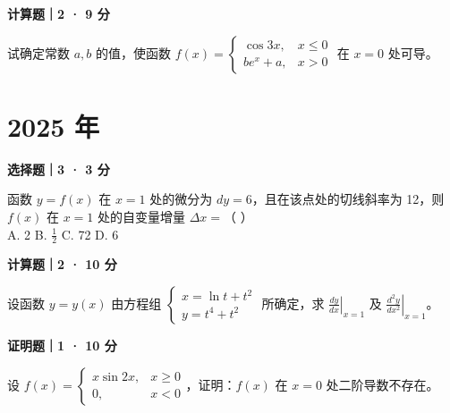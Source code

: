 \textbf{计算题｜2 · 9 分}

试确定常数 $a, b$ 的值，使函数 $f(x) = \begin{cases} \cos 3x, & x \le 0 \\ be^x+a, & x > 0 \end{cases}$ 在 $x = 0$ 处可导。


\section*{2025 年}


\textbf{选择题｜3 · 3 分}

函数 $y = f(x)$ 在 $x = 1$ 处的微分为 $dy = 6$，且在该点处的切线斜率为 12，则 $f(x)$ 在 $x = 1$ 处的自变量增量 $\Delta x =$（ \quad ）\\
A. 2 \quad B. $\frac{1}{2}$ \quad C. 72 \quad D. 6


\textbf{计算题｜2 · 10 分}

设函数 $y = y(x)$ 由方程组 $\begin{cases} x = \ln t + t^2 \\ y = t^4 + t^2 \end{cases}$ 所确定，求 $\left. \frac{dy}{dx} \right|_{x=1}$ 及 $\left. \frac{d^2y}{dx^2} \right|_{x=1}$。


\textbf{证明题｜1 · 10 分}

设 $f(x) = \begin{cases} x\sin 2x, & x \ge 0 \\ 0, & x < 0 \end{cases}$，证明：$f(x)$ 在 $x = 0$ 处二阶导数不存在。
